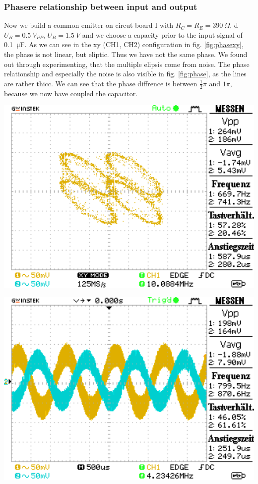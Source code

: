 \documentclass[a4paper,10pt]{article}
\newenvironment{Figure}
  {\par\medskip\noindent\minipage{\linewidth}}
  {\endminipage\par\medskip} %
\numberwithin{equation}{section}
\begin{document}
\begin{multicols}{2}
	\subsubsection{Phasere relationship between input and output}
	Now we build a common emitter on circut board I with $R_C=R_E=\SI{390}{\Omega}$, d$U_B=\SI{0.5}{V_{PP}}$, $U_B=\SI{1.5}{V}$ and we choose a capacity prior to the input signal of \SI{0.1}{\micro F}. As we can see in the xy (CH1, CH2) configuration in fig. \ref{fig:phasexy}, the phase is not linear, but eliptic. Thus we have not the same phase. We found out through experimenting, that the multiple elipsis come from noise. The phase relationship and especially the noise is also visible in fig. \ref{fig:phase}, as the lines are rather thicc. We can see that the phase diffrence is between $\frac{1}{2}\pi$ and $1\pi$, because we now have coupled the capacitor.
	\begin{Figure}
		\centering
		\includegraphics[width=1\textwidth]{../data/DS0020.png}
		\label{fig:phasexy}
	\end{Figure}
	\begin{Figure}
		\centering
		\includegraphics[width=1\textwidth]{../data/DS0021.png}
		\label{fig:phase}
	\end{Figure}

\end{multicols}
\end{document}
